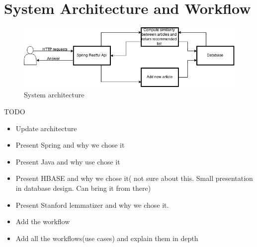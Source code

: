 \chapter{System Architecture and Workflow}
\label{chapter:system-architecture}

\begin{figure}[h]
\caption{System architecture}
\includegraphics[width=1.0\textwidth]{src/img/architecture.png}
\end{figure}
TODO
\begin{itemize}
	\item Update architecture
	\item Present Spring and why we chose it	
	\item Present Java and why use chose it
	\item Present HBASE and why we chose it( not sure about this. Small presentation in database design. Can bring it from there)
	\item Present Stanford lemmatizer and why we chose it.	
	\item Add the workflow
	\item Add all the workflows(use cases) and explain them in depth
\end{itemize}